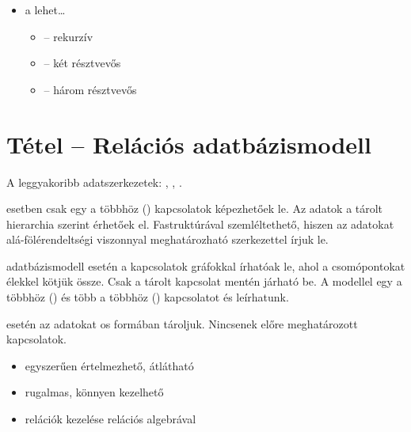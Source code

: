 \documentclass[main.tex]{subfiles}
\begin{document}
\begin{itemize}
    \item a  lehet\dots
    \begin{itemize}
      \item {} \tabto{2cm} – \tabto{2.5cm} rekurzív
      
      \item {} \tabto{2cm} – \tabto{2.5cm} két résztvevős

      \item {} \tabto{2cm} – \tabto{2.5cm} három résztvevős
    \end{itemize}
  \end{itemize}


  \section{Tétel – Relációs adatbázismodell} %

  A leggyakoribb adatszerkezetek:
  ,
  ,
  .

  \vspace{.5em}
   esetben csak egy a többhöz
  () kapcsolatok képezhetőek le.
  Az adatok a tárolt hierarchia szerint érhetőek el.
  Fastruktúrával szemléltethető,
  hiszen az adatokat alá-fölérendeltségi
  viszonnyal meghatározható szerkezettel írjuk le.

  \vspace{.5em}
   adatbázismodell esetén a kapcsolatok
  gráfokkal írhatóak le, ahol a csomópontokat élekkel
  kötjük össze. Csak a tárolt kapcsolat mentén járható be.
  A modellel egy a többhöz () és több a többhöz 
  () kapcsolatot és leírhatunk.


   esetén az adatokat os
  formában tároljuk. Nincsenek előre meghatározott kapcsolatok.
  \begin{itemize}
    \item egyszerűen értelmezhető, átlátható
    
    \item rugalmas, könnyen kezelhető
    
    \item relációk kezelése relációs algebrával
  \end{itemize}
\end{document}
